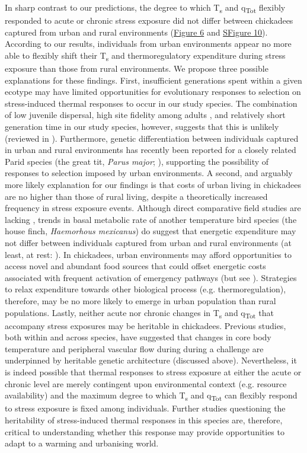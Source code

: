 \documentclass[12pt]{article}
\begin{document}
\noindent In sharp contrast to our predictions, the degree to which T\textsubscript{s} and q\textsubscript{Tot} flexibly responded to acute or chronic stress exposure did not differ between chickadees captured from urban and rural environments (\hyperref[Fig4.6]{Figure 6} and \hyperref[FigC.10]{SFigure 10}). According to our results, individuals from urban environments appear no more able to flexibly shift their T\textsubscript{s} and thermoregulatory expenditure during stress exposure than those from rural environments. We propose three possible explanations for these findings. First, insufficient generations spent within a given ecotype may have limited opportunities for evolutionary responses to selection on stress-induced thermal responses to occur in our study species. The combination of low juvenile dispersal, high site fidelity among adults \citep{weise_1979}, and relatively short generation time in our study species, however, suggests that this is unlikely (reviewed in \citealt{mcdonnell_2015}). Furthermore, genetic differentiation between individuals captured in urban and rural environments has recently been reported for a closely related Parid species (the great tit, \textit{Parus major}; \citealt{perrier_2018}), supporting the possibility of responses to selection imposed by urban environments. A second, and arguably more likely explanation for our findings is that costs of urban living in chickadees are no higher than those of rural living, despite a theoretically increased frequency in stress exposure events. Although direct comparative field studies are lacking \citep{sepp_2018}, trends in basal metabolic rate of another temperature bird species (the house finch, \textit{Haemorhous mexicanus}) do suggest that energetic expenditure may not differ between individuals captured from urban and rural environments (at least, at rest: \citealt{hutton_2018}). In chickadees, urban environments may afford opportunities to access novel and abundant food sources \citep{robb_2008,prasher_2019} that could offset energetic costs associated with frequent activation of emergency pathways (but see \citealt{demeyrier_2017}). Strategies to relax expenditure towards other biological process (e.g. thermoregulation), therefore, may be no more likely to emerge in urban population than rural populations. Lastly, neither acute nor chronic changes in T\textsubscript{s} and q\textsubscript{Tot} that accompany stress exposures may be heritable in chickadees. Previous studies, both within and across species, have suggested that changes in core body temperature and peripheral vascular flow during during a challenge are underpinned by heritable genetic architecture (discussed above). Nevertheless, it is indeed possible that thermal responses to stress exposure at either the acute or chronic level are merely contingent upon environmental context (e.g. resource availability) and the maximum degree to which T\textsubscript{s} and q\textsubscript{Tot} can flexibly respond to stress exposure is fixed among individuals. Further studies questioning the heritability of stress-induced thermal responses in this species are, therefore, critical to understanding whether this response may provide opportunities to adapt to a warming and urbanising world.\vspace{0.5cm}
\end{document}
